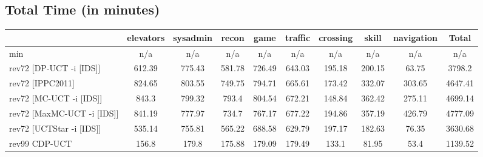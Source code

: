 \documentclass{article}
\begin{document}
\bigskip

\subsection*{Total Time (in minutes)}

\begin{tabular}{|l|r@{$\pm$}rr@{$\pm$}rr@{$\pm$}rr@{$\pm$}rr@{$\pm$}rr@{$\pm$}rr@{$\pm$}rr@{$\pm$}rr@{$\pm$}r|}
\hline

& \multicolumn{2}{c}{elevators}
& \multicolumn{2}{c}{sysadmin}
& \multicolumn{2}{c}{recon}
& \multicolumn{2}{c}{game}
& \multicolumn{2}{c}{traffic}
& \multicolumn{2}{c}{crossing}
& \multicolumn{2}{c}{skill}
& \multicolumn{2}{c}{navigation}
& \multicolumn{2}{c|}{Total}
\\
\hline
\hline
min
& \multicolumn{2}{c}{n/a}
& \multicolumn{2}{c}{n/a}
& \multicolumn{2}{c}{n/a}
& \multicolumn{2}{c}{n/a}
& \multicolumn{2}{c}{n/a}
& \multicolumn{2}{c}{n/a}
& \multicolumn{2}{c}{n/a}
& \multicolumn{2}{c}{n/a}
& \multicolumn{2}{c|}{n/a}
\\
rev72 [DP-UCT -i [IDS]]
& \multicolumn{2}{c}{612.39}
& \multicolumn{2}{c}{775.43}
& \multicolumn{2}{c}{581.78}
& \multicolumn{2}{c}{726.49}
& \multicolumn{2}{c}{643.03}
& \multicolumn{2}{c}{195.18}
& \multicolumn{2}{c}{200.15}
& \multicolumn{2}{c}{63.75}
& \multicolumn{2}{c|}{3798.2}
\\
rev72 [IPPC2011]
& \multicolumn{2}{c}{824.65}
& \multicolumn{2}{c}{803.55}
& \multicolumn{2}{c}{749.75}
& \multicolumn{2}{c}{794.71}
& \multicolumn{2}{c}{665.61}
& \multicolumn{2}{c}{173.42}
& \multicolumn{2}{c}{332.07}
& \multicolumn{2}{c}{303.65}
& \multicolumn{2}{c|}{4647.41}
\\
rev72 [MC-UCT -i [IDS]]
& \multicolumn{2}{c}{843.3}
& \multicolumn{2}{c}{799.32}
& \multicolumn{2}{c}{793.4}
& \multicolumn{2}{c}{804.54}
& \multicolumn{2}{c}{672.21}
& \multicolumn{2}{c}{148.84}
& \multicolumn{2}{c}{362.42}
& \multicolumn{2}{c}{275.11}
& \multicolumn{2}{c|}{4699.14}
\\
rev72 [MaxMC-UCT -i [IDS]]
& \multicolumn{2}{c}{841.19}
& \multicolumn{2}{c}{777.97}
& \multicolumn{2}{c}{734.7}
& \multicolumn{2}{c}{767.17}
& \multicolumn{2}{c}{677.22}
& \multicolumn{2}{c}{194.86}
& \multicolumn{2}{c}{357.19}
& \multicolumn{2}{c}{426.79}
& \multicolumn{2}{c|}{4777.09}
\\
rev72 [UCTStar -i [IDS]]
& \multicolumn{2}{c}{535.14}
& \multicolumn{2}{c}{755.81}
& \multicolumn{2}{c}{565.22}
& \multicolumn{2}{c}{688.58}
& \multicolumn{2}{c}{629.79}
& \multicolumn{2}{c}{197.17}
& \multicolumn{2}{c}{182.63}
& \multicolumn{2}{c}{76.35}
& \multicolumn{2}{c|}{3630.68}
\\
\hline
rev99 CDP-UCT
& \multicolumn{2}{c}{156.8}
& \multicolumn{2}{c}{179.8}
& \multicolumn{2}{c}{175.88}
& \multicolumn{2}{c}{179.09}
& \multicolumn{2}{c}{179.49}
& \multicolumn{2}{c}{133.1}
& \multicolumn{2}{c}{81.95}
& \multicolumn{2}{c}{53.4}
& \multicolumn{2}{c|}{1139.52}
\\
\hline
\end{tabular}%
\end{document}
